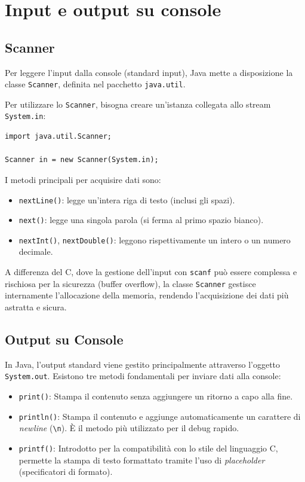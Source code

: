 \section{Input e output su console}

\subsection{Scanner}
Per leggere l'input dalla console (standard input), Java mette a disposizione la classe \texttt{Scanner}, definita nel pacchetto \texttt{java.util}. 

Per utilizzare lo \texttt{Scanner}, bisogna creare un'istanza collegata allo stream \texttt{System.in}:

\begin{lstlisting}[caption={Inizializzazione dello Scanner}]
import java.util.Scanner;

Scanner in = new Scanner(System.in);
\end{lstlisting}

I metodi principali per acquisire dati sono:
\begin{itemize}
    \item \texttt{nextLine()}: legge un'intera riga di testo (inclusi gli spazi).
    \item \texttt{next()}: legge una singola parola (si ferma al primo spazio bianco).
    \item \texttt{nextInt()}, \texttt{nextDouble()}: leggono rispettivamente un intero o un numero decimale.
\end{itemize}

\begin{observation}
A differenza del C, dove la gestione dell'input con \texttt{scanf} può essere complessa e rischiosa per la sicurezza (buffer overflow), la classe \texttt{Scanner} gestisce internamente l'allocazione della memoria, rendendo l'acquisizione dei dati più astratta e sicura.
\end{observation}

\subsection{Output su Console}

In Java, l'output standard viene gestito principalmente attraverso l'oggetto \texttt{System.out}. Esistono tre metodi fondamentali per inviare dati alla console:

\begin{itemize}
    \item \texttt{print()}: Stampa il contenuto senza aggiungere un ritorno a capo alla fine.
    \item \texttt{println()}: Stampa il contenuto e aggiunge automaticamente un carattere di \textit{newline} (\texttt{\textbackslash n}). È il metodo più utilizzato per il debug rapido.
    \item \texttt{printf()}: Introdotto per la compatibilità con lo stile del linguaggio C, permette la stampa di testo formattato tramite l'uso di \textit{placeholder} (specificatori di formato).
\end{itemize}

